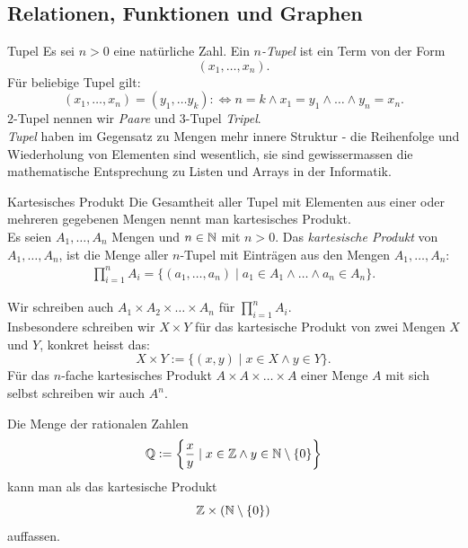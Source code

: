 \subsection{Relationen, Funktionen und Graphen}


\begin{definition}{Tupel}
Es sei $n>0$ eine natürliche Zahl. Ein $n$\textit{-Tupel} ist ein Term von der Form
\[
(x_1,\dots,x_n).
\]
Für beliebige Tupel gilt:
\[
(x_1,\dots,x_n)=(y_1,\dots y_k):\Leftrightarrow n=k\land x_1=y_1\land\dots\land y_n=x_n.
\]
$2$-Tupel nennen wir \textit{Paare} und $3$-Tupel \textit{Tripel}.\\
\textit{Tupel} haben im Gegensatz zu Mengen mehr innere Struktur - die Reihenfolge und Wiederholung von Elementen sind wesentlich, sie sind gewissermassen die mathematische Entsprechung zu Listen und Arrays in der Informatik.
\end{definition}



\begin{definition}{Kartesisches Produkt}
Die Gesamtheit aller Tupel mit Elementen aus einer oder mehreren gegebenen Mengen nennt man kartesisches Produkt.\\
Es seien $A_1,\dots, A_n$ Mengen und $n\in\mathbb{N}$ mit $n>0$.
Das \textit{kartesische Produkt} von $A_1,\dots, A_n$, ist die Menge aller $n$-Tupel mit Einträgen aus den Mengen $A_1,\dots ,A_n$:
\begin{align*}
\prod_{i=1}^{n}A_i=\big\{(a_1,\dots,a_n)\mid a_1\in A_1\land\dots\land a_n\in A_n \big\}.
\end{align*}
\end{definition}

\begin{remark}
    Wir schreiben auch $A_1\times A_2\times \dots\times A_n$ für $\prod_{i=1}^nA_i$.\\ Insbesondere schreiben wir $X\times Y$ für das kartesische Produkt von zwei Mengen $X$ und $Y$, konkret heisst das:
    \[
    X\times Y:=\{(x,y)\mid x\in X\land y\in Y \}.
    \]
    Für das $n$-fache kartesisches Produkt $A\times A\times\dots\times A$ einer Menge $A$ mit sich selbst schreiben wir auch $A^n$.
    \end{remark}

    \begin{example}
        Die Menge der rationalen Zahlen
        \[
        \mathbb{Q}:=\left\{\frac{x}{y}\mid x\in \mathbb{Z}\land y\in\mathbb{N}\setminus\{0\}\right\}
        \]
        kann man als das kartesische Produkt
        \[
        \mathbb{Z}\times(\mathbb{N}\setminus\{0\})
        \]
        auffassen.
    \end{example}

